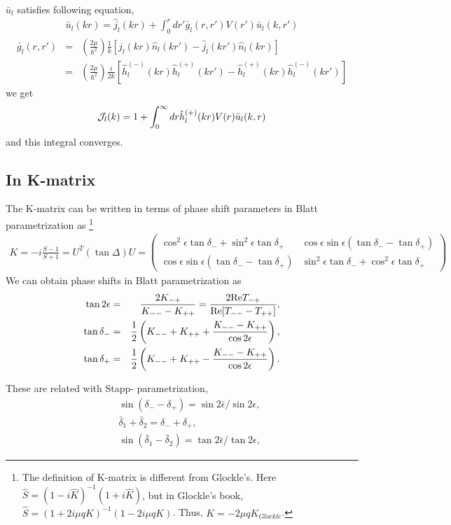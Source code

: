 \documentclass[10pt]{book}
\newcommand{\bea}{\begin{eqnarray}}
\newcommand{\eea}{\end{eqnarray}}
\newcommand{\no}{\nonumber \\}
\begin{document}
$\bar{u}_l$ satisfies following equation,
\bea 
\bar{u}_l(kr)=\hat{j}_l(kr)+\int_0^r dr' \bar{g}_l(r,r')V(r')\bar{u}_l(k,r')
\eea 
\bea 
\bar{g}_l(r,r') &=& (\frac{2\mu}{\hbar^2})\frac{1}{k}[\hat{j}_l(kr)\hat{n}_l(kr')
  -\hat{j}_l(kr')\hat{n}_l(kr)] \no 
  &=&(\frac{2\mu}{\hbar^2})\frac{i}{2k}[\hat{h}_l^{(-)}(kr)\hat{h}_l^{(+)}(kr')
  -\hat{h}_l^{(+)}(kr)\hat{h}_l^{(-)}(kr')] 
\eea 
we get 
\bea 
{\cal J}_l(k) = 1+\int_0^\infty dr \hat{h}_l^{(+)}(kr)V(r)\bar{u}_l(k,r)
\eea 
and this integral converges.  

\subsection{In K-matrix}
The K-matrix can be written in terms of phase shift parameters
in Blatt parametrization as
\footnote{
The definition of K-matrix is different  from Glockle's.
Here $\hat{S}=(1-i\hat K)^{-1}(1+i\hat{K})$, but in 
Glockle's book, $\hat{S}=(1+2i\mu q K)^{-1}(1-2i\mu q K)$.
Thus, $K=-2\mu q K_{Glockle}$.
}
\bea
K=-i\frac{S-1}{S+1}=U^T (\tan\Delta) U
 =\left(\begin{array}{cc}
   \cos^2\epsilon\tan\delta_{-}+\sin^2\epsilon\tan\delta_{+} &
   \cos\epsilon\sin\epsilon(\tan\delta_{-}-\tan\delta_{+})\\
   \cos\epsilon\sin\epsilon(\tan\delta_{-}-\tan\delta_{+}) &
   \sin^2\epsilon\tan\delta_{-}+\cos^2\epsilon\tan\delta_{+} 
   \end{array}
 \right) 
\eea
We can obtain phase shifts in Blatt parametrization as
\bea
\tan 2\epsilon &=& \frac{2 K_{-+}}{K_{--}-K_{++}}
                =\frac{2 {\rm Re}T_{-+}}{{\rm Re}[T_{--}-T_{++}]}  ,\no
\tan \delta_{-} &=& 
    \frac{1}{2}\left(K_{--}+K_{++}
    +\frac{K_{--}-K_{++}}{\cos 2\epsilon}\right),\no
\tan\delta_{+} &=&
     \frac{1}{2}\left(K_{--}+K_{++}
    -\frac{K_{--}-K_{++}}{\cos 2\epsilon}\right).
\eea

These are related with Stapp- parametrization,
\bea
& &\sin(\delta_{-}-\delta_{+})=\sin 2\bar{\epsilon}/\sin 2\epsilon,\no
& &\bar{\delta}_1+\bar{\delta}_2=\delta_{-}+\delta_{+},\no
& &\sin(\bar{\delta}_1-\bar{\delta}_2)=\tan 2\bar{\epsilon}/\tan 2\epsilon,
\eea
\end{document}
